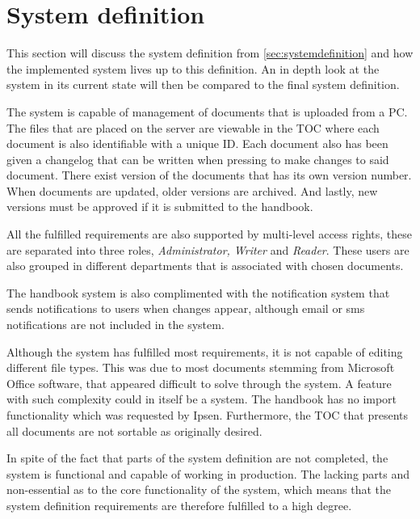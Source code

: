 \section{System definition}\label{sec:dissystemdef}

This section will discuss the system definition from \cref{sec:systemdefinition} and how the implemented system lives up to this definition.
An in depth look at the system in its current state will then be compared to the final system definition.

The system is capable of management of documents that is uploaded from a PC.
The files that are placed on the server are viewable in the TOC where each document is also identifiable with a unique ID.
Each document also has been given a changelog that can be written when pressing to make changes to said document.
There exist version of the documents that has its own version number.
When documents are updated, older versions are archived.
And lastly, new versions must be approved if it is submitted to the handbook.

All the fulfilled requirements are also supported by multi-level access rights, these are separated into three roles, \textit{Administrator, Writer} and \textit{Reader}.
These users are also grouped in different departments that is associated with chosen documents.

The handbook system is also complimented with the notification system that sends notifications to users when changes appear, although email or sms notifications are not included in the system.

Although the system has fulfilled most requirements, it is not capable of editing different file types.
This was due to most documents stemming from Microsoft Office software, that appeared difficult to solve through the system.
A feature with such complexity could in itself be a system.
The handbook has no import functionality which was requested by Ipsen.
Furthermore, the TOC that presents all documents are not sortable as originally desired.

In spite of the fact that parts of the system definition are not completed, the system is functional and capable of working in production.
The lacking parts and non-essential as to the core functionality of the system, which means that the system definition requirements are therefore fulfilled to a high degree.

